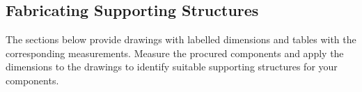 \subsection{Fabricating Supporting Structures}
The sections below provide drawings with labelled dimensions and tables with the corresponding measurements. Measure the procured components and apply the dimensions to the drawings to identify suitable supporting structures for your components.





\clearpage

\clearpage

\clearpage

\clearpage

\clearpage

\clearpage